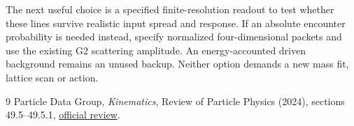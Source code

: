\documentclass[11pt,a4paper]{article}
\begin{document}
The next useful choice is a specified finite-resolution readout to
test whether these lines survive realistic input spread and response.
If an absolute encounter probability is needed instead, specify
normalized four-dimensional packets and use the existing G2 scattering
amplitude. An energy-accounted driven background remains an unused
backup. Neither option demands a new mass fit, lattice scan or action.

\begin{thebibliography}{9}
Particle Data Group, \emph{Kinematics}, Review of Particle Physics
(2024), sections 49.5--49.5.1,
\href{https://pdg.lbl.gov/2024/reviews/rpp2024-rev-kinematics.pdf}{official review}.
\end{thebibliography}
\end{document}
